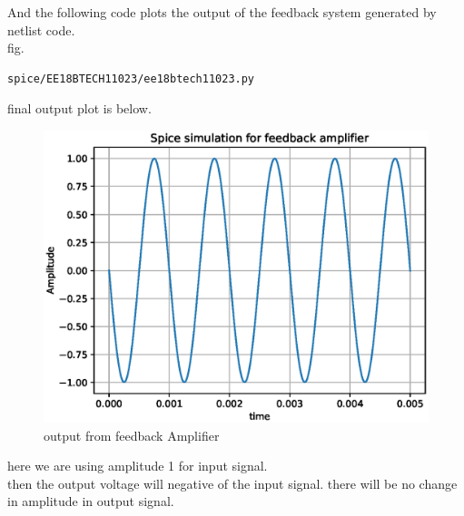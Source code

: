 \begin{enumerate}[label=\thesection.\arabic*.,ref=\thesection.\theenumi]
And the following code plots the output of the feedback system generated by netlist code.\\
fig.
 \begin{lstlisting}
spice/EE18BTECH11023/ee18btech11023.py
\end{lstlisting}
final output plot is below.
\begin{figure}[!h]
    \centering
    \includegraphics[width=\columnwidth]{figs/EE18BTECH11023/ee18btech11023_output.eps}
    \caption{output from feedback Amplifier}
    \label{fig:output}
\end{figure}
here we are using amplitude 1 for input signal. \\
then the output voltage will negative of the input signal. there will be no change in amplitude in output signal.\\

\end{enumerate}
